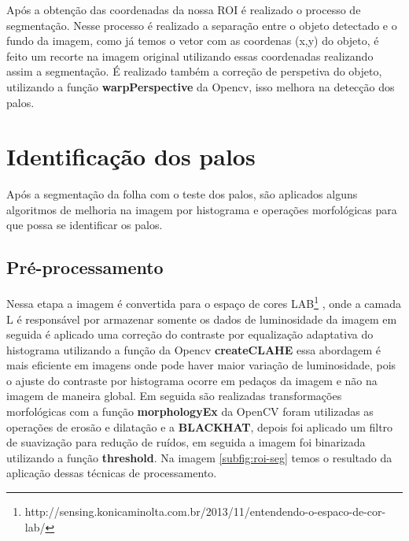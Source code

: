 Após a obtenção das coordenadas da nossa ROI é realizado o processo de segmentação. Nesse processo é realizado a separação entre o objeto detectado e o fundo da imagem, como já temos o vetor com as coordenas (x,y) do objeto, é feito um recorte na imagem original utilizando essas coordenadas realizando assim a segmentação. É realizado também a correção de perspetiva do objeto, utilizando a função \textbf{warpPerspective} da Opencv, isso melhora na detecção dos palos.

\section{Identificação dos palos}
\label{sec:ident-palos}

Após a segmentação da folha com o teste dos palos, são aplicados alguns algoritmos  de melhoria na imagem por histograma e operações morfológicas para que possa se identificar os palos.
\subsection{Pré-processamento}
\label{sec:pre-proce}
Nessa etapa a imagem é convertida para o espaço de cores LAB\footnote{http://sensing.konicaminolta.com.br/2013/11/entendendo-o-espaco-de-cor-lab/} ,  onde a camada L é responsável por armazenar somente os dados de luminosidade da imagem em seguida é aplicado uma correção do contraste por equalização adaptativa do histograma utilizando a função da Opencv \textbf{createCLAHE} essa abordagem é mais eficiente em imagens onde pode haver maior variação de luminosidade, pois o ajuste do contraste por histograma ocorre em pedaços da imagem e não na imagem de maneira global. Em seguida são realizadas  transformações morfológicas  com a função \textbf{morphologyEx} da OpenCV foram utilizadas as operações de erosão e dilatação e a \textbf{BLACKHAT}, depois foi aplicado um filtro de suavização  para redução de ruídos, em seguida a imagem foi binarizada utilizando a função \textbf{threshold}.
Na imagem \ref{subfig:roi-seg}  temos o resultado da aplicação dessas técnicas de processamento.

